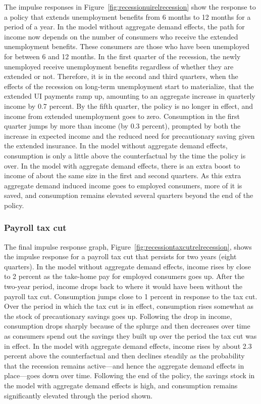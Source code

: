 \documentclass[qe]{econsocart}
\begin{document}
The impulse responses in Figure~\ref{fig:recessionuirelrecession} show the response to a policy that extends unemployment benefits from 6 months to 12 months for a period of a year.
In the model without aggregate demand effects, the path for income now depends on the number of consumers who receive the extended unemployment benefits.
These consumers are those who have been unemployed for between 6 and 12 months.
In the first quarter of the recession, the newly unemployed receive unemployment benefits regardless of whether they are extended or not.
Therefore, it is in the second and third quarters, when the effects of the recession on long-term unemployment start to materialize, that the extended UI payments ramp up, amounting to an aggregate increase in quarterly income by 0.7 percent.
By the fifth quarter, the policy is no longer in effect, and income from extended unemployment goes to zero.
Consumption in the first quarter jumps by more than income (by 0.3 percent), prompted by both the increase in expected income and the reduced need for precautionary saving given the extended insurance.
In the model without aggregate demand effects, consumption is only a little above the counterfactual by the time the policy is over.
In the model with aggregate demand effects, there is an extra boost to income of about the same size in the first and second quarters.
As this extra aggregate demand induced income goes to employed consumers, more of it is saved, and consumption remains elevated several quarters beyond the end of the policy.

\subsubsection{Payroll tax cut}

The final impulse response graph, Figure~\ref{fig:recessiontaxcutrelrecession}, shows the impulse response for a payroll tax cut that persists for two years (eight quarters).
In the model without aggregate demand effects, income rises by close to 2 percent as the take-home pay for employed consumers goes up.
After the two-year period, income drops back to where it would have been without the payroll tax cut.
Consumption jumps close to 1 percent in response to the tax cut.
Over the period in which the tax cut is in effect, consumption rises somewhat as the stock of precautionary savings goes up.
Following the drop in income, consumption drops sharply because of the splurge and then decreases over time as consumers spend out the savings they built up over the period the tax cut was in effect.
In the model with aggregate demand effects, income rises by about 2.3 percent above the counterfactual and then declines steadily as the probability that the recession remains active---and hence the aggregate demand effects in place---goes down over time.
Following the end of the policy, the savings stock in the model with aggregate demand effects is high, and consumption remains significantly elevated through the period shown.
\end{document}
